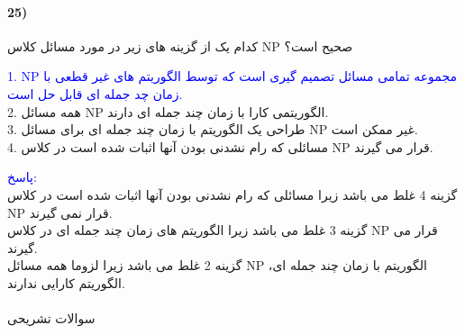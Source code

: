 \documentclass[10pt,a4paper]{article}
\begin{document}
	\paragraph{25)} کدام یک از گزینه های زیر در مورد مسائل کلاس NP صحیح است؟
	\begin{flushright} 
		\textcolor{blue}{1. NP مجموعه تمامی مسائل تصمیم گیری است که توسط الگوریتم های غیر قطعی با زمان چد جمله ای قابل حل است.}\\
	2. همه مسائل NP الگوریتمی کارا با زمان چند جمله ای دارند.\\
	3. طراحی یک الگوریتم با زمان چند جمله ای برای مسائل NP غیر ممکن است.\\
	4. مسائلی که رام نشدنی بودن آنها اثبات شده است در کلاس NP قرار می گیرند.
	\end{flushright}
	\begin{flushright} 
		\textcolor{blue}{پاسخ:} \\
		گزینه 4 غلط می باشد زیرا مسائلی که رام نشدنی بودن آنها اثبات شده است در کلاس NP قرار نمی گیرند. \\
		گزینه 3 غلط می باشد زیرا الگوریتم های زمان چند جمله ای در کلاس NP قرار می گیرند. \\
		گزینه 2 غلط می باشد زیرا لزوما همه مسائل NP الگوریتم با زمان چند جمله ای، الگوریتم کارایی ندارند.
	\end{flushright}

	\newpage
	\paragraph{}
	سوالات تشریحی
\end{document}
